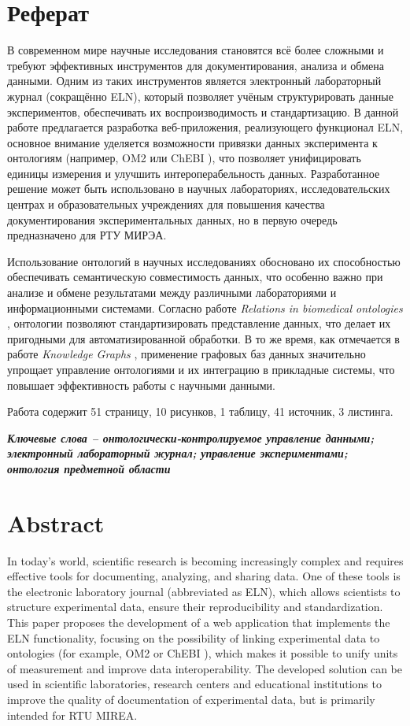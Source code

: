 \section*{\centering Реферат}
В современном мире научные исследования становятся всё более сложными и требуют эффективных инструментов для документирования, анализа и обмена данными. Одним из таких инструментов является электронный лабораторный журнал (сокращённо ELN), который позволяет учёным структурировать данные экспериментов, обеспечивать их воспроизводимость и стандартизацию. В данной работе предлагается разработка веб-приложения, реализующего функционал ELN, основное внимание уделяется возможности привязки данных эксперимента к онтологиям (например, OM2 \cite{ontology:OM2} или ChEBI \cite{ontology:СhEBI}), что позволяет унифицировать единицы измерения и улучшить интероперабельность данных. Разработанное решение может быть использовано в научных лабораториях, исследовательских центрах и образовательных учреждениях для повышения качества документирования экспериментальных данных, но в первую очередь предназначено для РТУ МИРЭА.

Использование онтологий в научных исследованиях обосновано их способностью обеспечивать семантическую совместимость данных, что особенно важно при анализе и обмене результатами между различными лабораториями и информационными системами. Согласно работе \textit{Relations in biomedical ontologies} \cite{ontology:base1}, онтологии позволяют стандартизировать представление данных, что делает их пригодными для автоматизированной обработки. В то же время, как отмечается в работе \textit{Knowledge Graphs} \cite{ontology:base2}, применение графовых баз данных значительно упрощает управление онтологиями и их интеграцию в прикладные системы, что повышает эффективность работы с научными данными.

Работа содержит 51 страницу, 10 рисунков, 1 таблицу, 41 источник, 3 листинга.

\textit{\textbf{Ключевые слова -- онтологически-контролируемое управление данными; электронный лабораторный журнал; управление экспериментами; онтология предметной области}}

\newpage

\section*{\centering Abstract}
In today's world, scientific research is becoming increasingly complex and requires effective tools for documenting, analyzing, and sharing data. One of these tools is the electronic laboratory journal (abbreviated as ELN), which allows scientists to structure experimental data, ensure their reproducibility and standardization. This paper proposes the development of a web application that implements the ELN functionality, focusing on the possibility of linking experimental data to ontologies (for example, OM2\cite{ontology:OM2} or ChEBI \cite{ontology:СhEBI}), which makes it possible to unify units of measurement and improve data interoperability. The developed solution can be used in scientific laboratories, research centers and educational institutions to improve the quality of documentation of experimental data, but is primarily intended for RTU MIREA.

